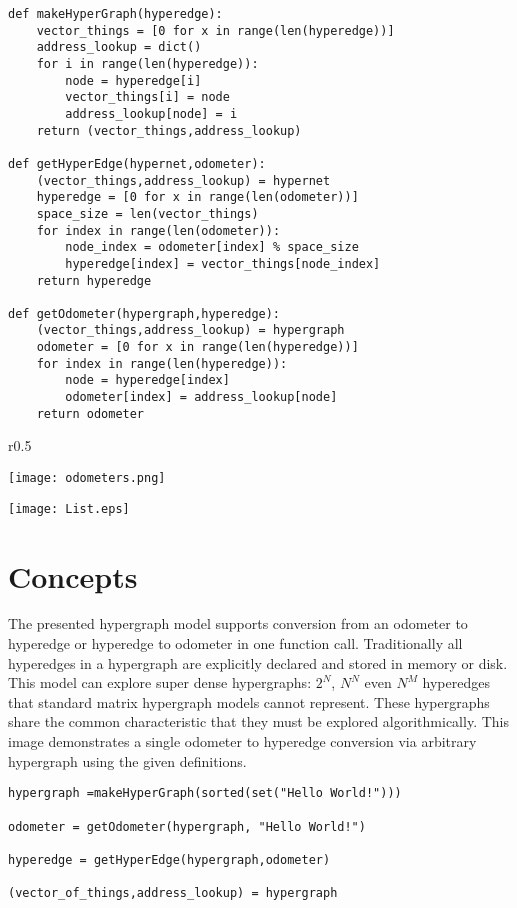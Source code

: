 \begin{lstlisting}
def makeHyperGraph(hyperedge):
    vector_things = [0 for x in range(len(hyperedge))]
    address_lookup = dict()
    for i in range(len(hyperedge)):
        node = hyperedge[i]
        vector_things[i] = node
        address_lookup[node] = i
    return (vector_things,address_lookup)

def getHyperEdge(hypernet,odometer):
    (vector_things,address_lookup) = hypernet
    hyperedge = [0 for x in range(len(odometer))]
    space_size = len(vector_things)
    for index in range(len(odometer)):
        node_index = odometer[index] % space_size
        hyperedge[index] = vector_things[node_index]
    return hyperedge
    
def getOdometer(hypergraph,hyperedge):
    (vector_things,address_lookup) = hypergraph
    odometer = [0 for x in range(len(hyperedge))]
    for index in range(len(hyperedge)):
        node = hyperedge[index]
        odometer[index] = address_lookup[node]
    return odometer
\end{lstlisting}
\newpage
\begin{wrapfigure}{r}{0.5\textwidth}
  \begin{center}
    \texttt{[image: odometers.png]}
  \end{center}
\end{wrapfigure}

\texttt{[image: List.eps]}
\section{Concepts}

\indent The presented hypergraph model supports conversion from an odometer to hyperedge or hyperedge to odometer in one function call. Traditionally all hyperedges in a hypergraph are explicitly declared and stored in memory or disk. \\

This model can explore super dense hypergraphs: $2^N$, $N^N$ even $N^M$ hyperedges that standard matrix hypergraph models cannot represent. These hypergraphs share the common characteristic that they must be explored algorithmically. This image demonstrates a single odometer to hyperedge conversion via arbitrary hypergraph using the given definitions.\\

\begin{lstlisting}
hypergraph =makeHyperGraph(sorted(set("Hello World!")))

odometer = getOdometer(hypergraph, "Hello World!")

hyperedge = getHyperEdge(hypergraph,odometer)

(vector_of_things,address_lookup) = hypergraph
\end{lstlisting}
